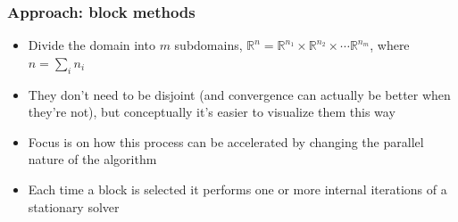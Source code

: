 \documentclass{beamer}
\begin{document}
\begin{frame}
	\frametitle{Approach: block methods}
	\begin{itemize}
		\item Divide the domain into $m$ subdomains, $\mathbb{R}^n = \mathbb{R}^{n_1} \times \mathbb{R}^{n_2} \times \cdots \mathbb{R}^{n_m}$, where $n = \sum_i n_i$
		\item They don't need to be disjoint (and convergence can actually be better when they're not), but conceptually it's easier to visualize them this way
		\item Focus is on how this process can be accelerated by changing the parallel nature of the algorithm
		\item Each time a block is selected it performs one or more internal iterations of a stationary solver
	\end{itemize}
\end{frame}
\end{document}
